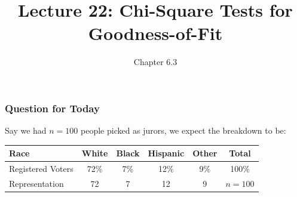 \documentclass[handout]{beamer}
\title{Lecture 22: Chi-Square Tests for Goodness-of-Fit}
\author{Chapter 6.3}
\date{}
\newcommand{\blue}[1]{\textcolor{blue2}{#1}}
\begin{document}
\begin{frame}
\titlepage
\end{frame}


%
%


\begin{frame}[fragile]
\frametitle{Question for Today}
Say we had $n=100$ people picked as jurors, we \blue{expect} the breakdown to be:

\begin{center}
\begin{tabular}{l||cccc|c}
Race & White & Black & Hispanic & Other & Total \\ 
\hline
Registered Voters & 72\% & 7\% & 12\% & 9\% & 100\%\\ 
Representation & 72 & 7 & 12 & 9 & $n=100$ \\ 
\end{tabular}
\end{center}

\end{frame}


%
%
\end{document}
